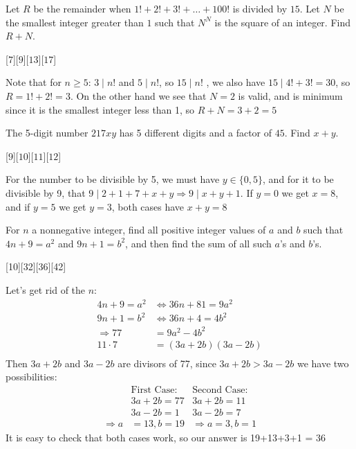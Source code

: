 \begin{problem}
    Let $R$ be the remainder when $1! + 2! + 3! + \dots + 100!$ is divided by $15$. Let $N$ be the smallest integer greater than $1$ such that $N^N$ is the square of an integer. Find $R + N$.
\end{problem}

[$7$][$9$][$13$][$17$]

\begin{solution}[A]
    Note that for $n\geq 5$: $3 \mid n!$ and $5\mid n!$, so $15 \mid n!$ , we also have $15 \mid 4!+3! = 30$, so $R=1!+2!=3$. On the other hand we see that $N=2$ is valid, and is minimum since it is the smallest integer less than 1, so $R+N=3+2=\boxed{5}$
\end{solution}

\begin{problem}
    The 5-digit number $217xy$ has 5 different digits and a factor of $45$. Find $x + y$.
\end{problem}

[$9$][$10$][$11$][$12$]

\begin{solution}[A]
     For the number to be divisible by 5, we must have $y\in \{0,5\}$, and for it to be divisible by 9, that $9 \mid 2+1+7+x+y \Rightarrow 9 \mid x+y+1$. If $y=0$ we get $x=8$, and if $y=5$ we get $y=3$, both cases have $x+y=\boxed{8}$
\end{solution}

\begin{problem}
    For $n$ a nonnegative integer, find all positive integer values of $a$ and $b$ such that $4n + 9 = a^2$ and $9n + 1 = b^2$, and then find the sum of all such $a$’s and $b$’s.
\end{problem}

[10][32][36][42]

\begin{solution}[D]
     Let's get rid of the $n$:
    \begin{align*}
        4n+9=a^2 &\iff 36n+81=9a^2 \\
        9n+1 = b^2 &\iff 36n+4=4b^2 \\
        \Rightarrow77 &= 9a^2-4b^2 
        \\11\cdot 7&=(3a+2b)(3a-2b) \\
    \end{align*}
    Then $3a+2b$ and $3a-2b$ are divisors of 77, since $3a+2b>3a-2b$ we have two possibilities:
    \begin{align*}
        &\text{First Case: }  &\text{Second Case: }  \\
        &3a+2b=77                &3a+2b=11\\
        &3a-2b=1                 &3a-2b=7\\
        \Rightarrow a&=13,b=19  &\Rightarrow a=3,b=1
    \end{align*}
    It is easy to check that both cases work, so our answer is 19+13+3+1 = $\boxed{36}$
\end{solution}

